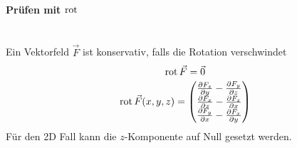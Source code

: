 \paragraph{Prüfen mit $\operatorname{rot}$}~\\
Ein Vektorfeld $\vec{F}$ ist konservativ, falls die Rotation verschwindet
\[ \operatorname{rot}\vec{F} = \vec{0} \]
\[ \operatorname{rot}\vec{F}(x,y,z) = \begin{pmatrix}
	\frac{\partial F_z}{\partial y} - \frac{\partial F_y}{\partial z}\\
	\frac{\partial F_x}{\partial z} - \frac{\partial F_z}{\partial x}\\
	\frac{\partial F_y}{\partial x} - \frac{\partial F_x}{\partial y}\\
	\end{pmatrix} \]
Für den 2D Fall kann die $z$-Komponente auf Null gesetzt werden.
